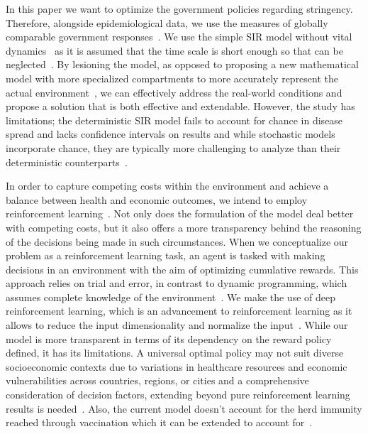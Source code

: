 \documentclass[tikz,fleqn,12pt]{wlscirep}
\begin{document}
In this paper we want to optimize the government policies regarding stringency. Therefore, alongside epidemiological data, we use the measures of globally comparable government responses~\cite{Hale2021}. We use the simple SIR model without vital dynamics~\cite{Hethcote1989, Hethcote2008, ALLEN2017128} as it is assumed that the time scale is short enough so that can be neglected~\cite{Cooper2020}. By lesioning the model, as opposed to proposing a new mathematical model with more specialized compartments to more accurately represent the actual environment~\cite{Bjrnstad2020, Mwalili2020}, we can effectively address the real-world conditions and propose a solution that is both effective and extendable. However, the study has limitations; the deterministic SIR model fails to account for chance in disease spread and lacks confidence intervals on results and while stochastic models incorporate chance, they are typically more challenging to analyze than their deterministic counterparts~\cite{Hethcote2008}.

In order to capture competing costs within the environment and achieve a balance between health and economic outcomes, we intend to employ reinforcement learning~\cite{Nguyen2022, Bastani2021, Song2022, Ohi2020, PADMANABHAN2021102676}. Not only does the formulation of the model deal better with competing costs, but it also offers a more transparency behind the reasoning of the decisions being made in such circumstances. When we conceptualize our problem as a reinforcement learning task, an agent is tasked with making decisions in an environment with the aim of optimizing cumulative rewards. This approach relies on trial and error, in contrast to dynamic programming, which assumes complete knowledge of the environment~\cite{Lavet2018}. We make the use of deep reinforcement learning, which is an advancement to reinforcement learning as it allows to reduce the input dimensionality and normalize the input~\cite{Lavet2018, Arulkumaran2017, Henderson_Islam_Bachman_Pineau_Precup_Meger_2018, Mnih2015}. While our model is more transparent in terms of its dependency on the reward policy defined, it has its limitations. A universal optimal policy may not suit diverse socioeconomic contexts due to variations in healthcare resources and economic vulnerabilities across countries, regions, or cities and a comprehensive consideration of decision factors, extending beyond pure reinforcement learning results is needed~\cite{Song2022, Dunn2017, Demir2006}. Also, the current model doesn't account for the herd immunity reached through vaccination which it can be extended to account for~\cite{Marinov2022}.
\end{document}
